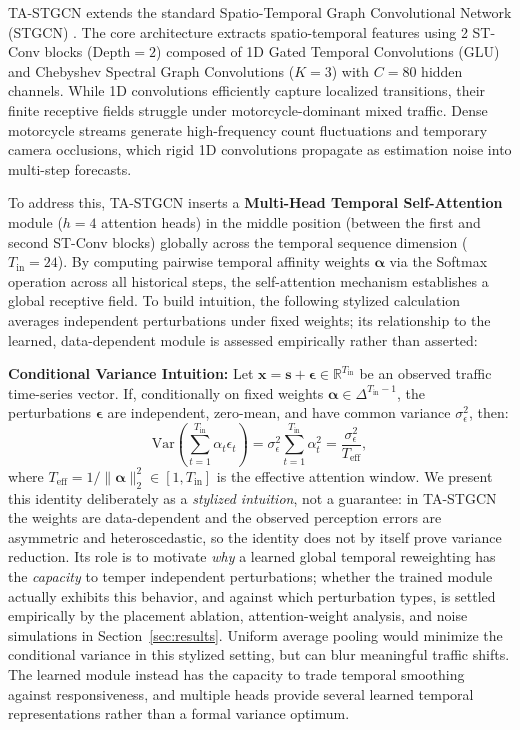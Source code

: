 \documentclass[journal,twocolumn]{IEEEtran}
\begin{document}
TA-STGCN extends the standard Spatio-Temporal Graph Convolutional Network (STGCN) \cite{stgcn}. The core architecture extracts spatio-temporal features using 2 ST-Conv blocks ($\text{Depth}=2$) composed of 1D Gated Temporal Convolutions (GLU) and Chebyshev Spectral Graph Convolutions ($K=3$) \cite{chebnet} with $C=80$ hidden channels. While 1D convolutions efficiently capture localized transitions, their finite receptive fields struggle under motorcycle-dominant mixed traffic. Dense motorcycle streams generate high-frequency count fluctuations and temporary camera occlusions, which rigid 1D convolutions propagate as estimation noise into multi-step forecasts.

To address this, TA-STGCN inserts a \textbf{Multi-Head Temporal Self-Attention} module \cite{attention} ($h=4$ attention heads) in the middle position (between the first and second ST-Conv blocks) globally across the temporal sequence dimension ($T_{\text{in}} = 24$). By computing pairwise temporal affinity weights $\boldsymbol{\alpha}$ via the Softmax operation across all historical steps, the self-attention mechanism establishes a global receptive field. To build intuition, the following stylized calculation averages independent perturbations under fixed weights; its relationship to the learned, data-dependent module is assessed empirically rather than asserted:

\textbf{Conditional Variance Intuition:}
Let $\mathbf{x} = \mathbf{s} + \boldsymbol{\epsilon} \in \mathbb{R}^{T_{\text{in}}}$ be an observed traffic time-series vector. If, conditionally on fixed weights $\boldsymbol{\alpha} \in \Delta^{T_{\text{in}}-1}$, the perturbations $\boldsymbol{\epsilon}$ are independent, zero-mean, and have common variance $\sigma_{\epsilon}^2$, then:
\begin{equation}
\label{eq:attn_var}
\text{Var}\left( \sum_{t=1}^{T_{\text{in}}} \alpha_t \epsilon_t \right) = \sigma_{\epsilon}^2 \sum_{t=1}^{T_{\text{in}}} \alpha_t^2 = \frac{\sigma_{\epsilon}^2}{T_{\text{eff}}},
\end{equation}
where $T_{\text{eff}} = 1 / \|\boldsymbol{\alpha}\|_2^2 \in [1, T_{\text{in}}]$ is the effective attention window. We present this identity deliberately as a \emph{stylized intuition}, not a guarantee: in TA-STGCN the weights are data-dependent and the observed perception errors are asymmetric and heteroscedastic, so the identity does not by itself prove variance reduction. Its role is to motivate \emph{why} a learned global temporal reweighting has the \emph{capacity} to temper independent perturbations; whether the trained module actually exhibits this behavior, and against which perturbation types, is settled empirically by the placement ablation, attention-weight analysis, and noise simulations in Section~\ref{sec:results}. Uniform average pooling would minimize the conditional variance in this stylized setting, but can blur meaningful traffic shifts. The learned module instead has the capacity to trade temporal smoothing against responsiveness, and multiple heads provide several learned temporal representations rather than a formal variance optimum.
\end{document}
